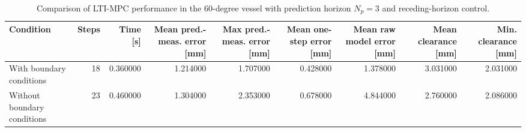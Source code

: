 \begin{table}
\caption{Comparison of LTI-MPC performance in the 60-degree vessel with prediction horizon $N_p=3$ and receding-horizon control.}
\label{tab:lti_mpc_boundary_comparison}
\begin{tabular}{lrrrrrrrr}
\toprule
Condition & Steps & Time [s] & Mean pred.-meas. error [mm] & Max pred.-meas. error [mm] & Mean one-step error [mm] & Mean raw model error [mm] & Mean clearance [mm] & Min. clearance [mm] \\
\midrule
With boundary conditions & 18 & 0.360000 & 1.214000 & 1.707000 & 0.428000 & 1.378000 & 3.031000 & 2.031000 \\
Without boundary conditions & 23 & 0.460000 & 1.304000 & 2.353000 & 0.678000 & 4.844000 & 2.760000 & 2.086000 \\
\bottomrule
\end{tabular}
\end{table}

